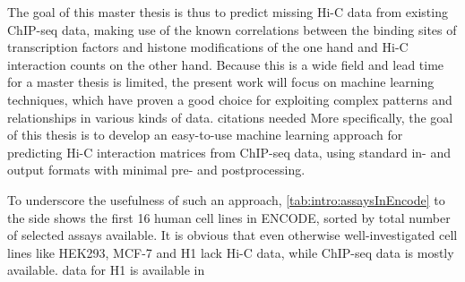 The goal of this master thesis is thus to predict missing Hi-C data from existing ChIP-seq data,
making use of the known correlations between the binding sites of transcription factors and histone modifications of the one hand 
and Hi-C interaction counts on the other hand. 
Because this is a wide field and lead time for a master thesis is limited, 
the present work will focus on machine learning techniques,
which have proven a good choice for exploiting complex patterns
and relationships in various kinds of data. \xxx citations needed
More specifically, the goal of this thesis is to develop an easy-to-use machine learning
approach for predicting Hi-C interaction matrices from ChIP-seq data, 
using standard in- and output formats with minimal pre- and postprocessing.

To underscore the usefulness of such an approach, \cref{tab:intro:assaysInEncode} to the side shows the first 16 human cell lines in ENCODE, 
sorted by total number of selected assays available.
It is obvious that even otherwise well-investigated cell lines like HEK293, MCF-7 and H1 lack Hi-C data, while ChIP-seq data is mostly available.
\xxx data for H1 is available in 


